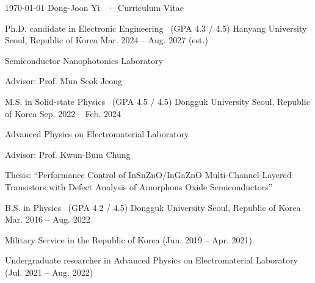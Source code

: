 \documentclass[11pt, a4paper]{awesome-cv}
\begin{document}
\makecvheader

\makecvfooter
  {\today}
  {Dong-Joon Yi \, ·\, Curriculum Vitae}
  {\thepage}


\begin{cventries}

  \cventry
    {Ph.D. candidate in Electronic Engineering \, (GPA 4.3 / 4.5)}
    {Hanyang University}
    {Seoul, Republic of Korea}
    {Mar. 2024 -- Aug. 2027 (est.)}
    {
      \begin{cvitems}
        \item {Semiconductor Nanophotonics Laboratory}
        \item {Advisor: Prof. Mun Seok Jeong}
      \end{cvitems}
    }

  \cventry
    {M.S. in Solid-state Physics \, (GPA 4.5 / 4.5)}
    {Dongguk University}
    {Seoul, Republic of Korea}
    {Sep. 2022 -- Feb. 2024}
    {
      \begin{cvitems}
        \item {Advanced Physics on Electromaterial Laboratory}
        \item {Advisor: Prof. Kwun-Bum Chung}
        \item {Thesis: ``Performance Control of InSnZnO/InGaZnO Multi-Channel-Layered Transistors with Defect Analysis of Amorphous Oxide Semiconductors''}
      \end{cvitems}
    }

  \cventry
    {B.S. in Physics \, (GPA 4.2 / 4.5)}
    {Dongguk University}
    {Seoul, Republic of Korea}
    {Mar. 2016 -- Aug. 2022}
    {
      \begin{cvitems}
        \item {Military Service in the Republic of Korea (Jun. 2019 -- Apr. 2021)}
        \item {Undergraduate researcher in Advanced Physics on Electromaterial Laboratory (Jul. 2021 -- Aug. 2022)}
      \end{cvitems}
    }

\end{cventries}

\end{document}
